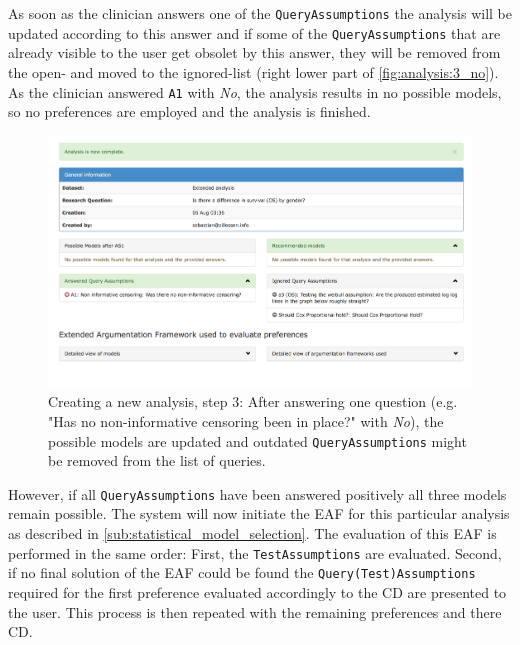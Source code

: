 As soon as the clinician answers one of the \texttt{QueryAssumptions} the analysis will be updated according to this answer and if some of the \texttt{QueryAssumptions} that are already visible to the user get obsolet by this answer, they will be removed from the open- and moved to the ignored-list (right lower part of \autoref{fig:analysis:3_no}). 
As the clinician answered \texttt{A1} with \textit{No}, the analysis results in no possible models, so no preferences are employed and the analysis is finished.

\begin{figure}[!ht]
	\centering
	\includegraphics[width=\textwidth]{figures/ui_analysis_2_no}
	\caption{Creating a new analysis, step 3: After answering one question (e.g. "Has no non-informative censoring been in place?" with \textit{No}), the possible models are updated and outdated \texttt{QueryAssumptions} might be removed from the list of queries.}
	\label{fig:analysis:3_no}
\end{figure}

However, if all \texttt{QueryAssumptions} have been answered positively all three models remain possible. The system will now initiate the \gls{EAF} for this particular analysis as described in \autoref{sub:statistical_model_selection}. The evaluation of this \gls{EAF} is performed in the same order: First, the \texttt{TestAssumptions} are evaluated. Second, if no final solution of the \gls{EAF} could be found the \texttt{Query(Test)Assumptions} required for the first preference evaluated accordingly to the \gls{CD} are presented to the user. This process is then repeated with the remaining preferences and there \gls{CD}.

